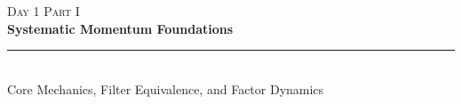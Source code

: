 \documentclass[10pt]{beamer}
\begin{document}
\begin{frame}[plain]
  \vfill
  \centering
  {\scriptsize\scshape\color{darkteal!70!black} Day 1 \quad\textbar\quad Part I}\\[0.35cm]
  {\large\bfseries\color{darkteal} Systematic Momentum Foundations}\\[0.25cm]
  {\color{darkteal!40!black}\rule{3.5cm}{0.4pt}}\\[0.3cm]
  {\footnotesize\color{black!70} Core Mechanics, Filter Equivalence, and Factor Dynamics}
  \vfill
\end{frame}

\end{document}
